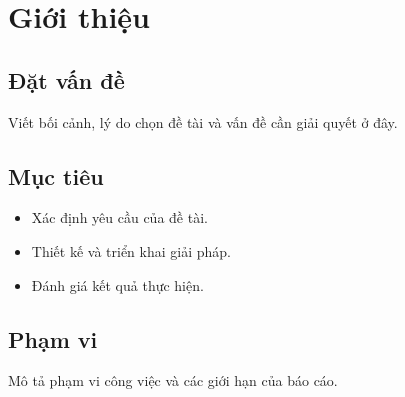 \chapter{Giới thiệu}
\section{Đặt vấn đề}
Viết bối cảnh, lý do chọn đề tài và vấn đề cần giải quyết ở đây.
\section{Mục tiêu}
\begin{itemize}
  \item Xác định yêu cầu của đề tài.
  \item Thiết kế và triển khai giải pháp.
  \item Đánh giá kết quả thực hiện.
\end{itemize}
\section{Phạm vi}
Mô tả phạm vi công việc và các giới hạn của báo cáo.
